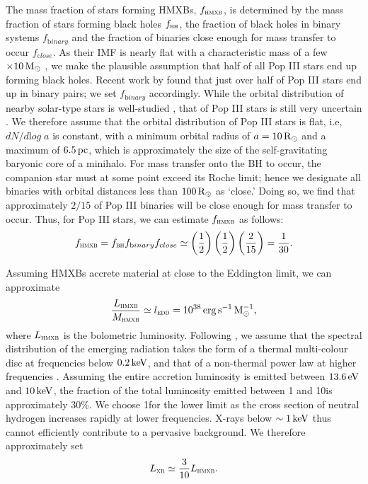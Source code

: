 \documentclass[../thesis.tex]{subfiles}
\begin{document}
The mass fraction of stars forming HMXBs, $f_{\textsc{hmxb}}$, is determined by
the mass fraction of stars forming black holes $f_{\textsc{bh}}$, the
fraction of black holes in binary systems $f_{\mathrm binary}$ and the
fraction of binaries close enough for mass transfer to occur
$f_{\mathrm close}$. As their IMF is nearly flat with a characteristic
mass of a few $\times10\,\mathrm{M}_{\odot}$ \citep{Bromm2013}, we make the
plausible assumption that half of all Pop III stars end up forming
black holes.  Recent work by \citet{StacyBromm2013} found that just
over half of Pop III stars end up in binary pairs; we set $f_{\mathrm
  binary}$ accordingly. While the orbital distribution of nearby
solar-type stars is well-studied \citep[e.g.,][]{DuquennoyMayor1991},
that of Pop III stars is still very uncertain \citep[but
see][]{StacyBromm2013}.  We therefore assume that the orbital
distribution of Pop III stars is flat, i.e, $dN/d{\mathrm log} \; a$ is
constant, with a minimum orbital radius of $a=10\,\mathrm{R}_{\odot}$ and a maximum of
$6.5\,\mathrm{pc}$, which is approximately the size of the self-gravitating baryonic core of a minihalo. For mass transfer onto the BH to occur, the companion star
must at some point exceed its Roche limit; hence we designate all
binaries with orbital distances less than $100\,\mathrm{R}_{\odot}$ as `close.'
Doing so, we find that approximately $2/15$ of Pop III binaries will be
close enough for mass transfer to occur.
 Thus, for Pop III stars, we can estimate $f_{\textsc{hmxb}}$ as follows:  
\begin{equation}
  f_{\textsc{hmxb}} = f_{\textsc{bh}} f_{\mathrm binary} f_{\mathrm close} \simeq \left(\frac{1}{2}\right) 
  \left(\frac{1}{2}\right) \left(\frac{2}{15}\right) = \frac{1}{30}.
\end{equation}

Assuming HMXBs accrete material at close to the Eddington limit, we can approximate 
\begin{equation}
  \frac{L_{\textsc{hmxb}}}{M_{\textsc{hmxb}}} \simeq l_\textsc{edd} = 10^{38} \,\mathrm{erg} \,\mathrm{s}^{-1} \,\mathrm{M}_{\odot}^{-1},
\end{equation}
where $L_{\textsc{hmxb}}$ is the bolometric luminosity.  Following \citet{Jeonetal2014a}, we assume that the spectral distribution of the
emerging radiation takes the form of a thermal multi-colour disc at
frequencies below $0.2 \,\mathrm{keV}$, and that of a non-thermal power law at
higher frequencies \citep[e.g.,][]{Mitsudaetal1984}.  Assuming the entire accretion luminosity is
emitted between $13.6\,\mathrm{eV}$ and $10\,\mathrm{keV}$, the fraction of the total
luminosity emitted between 1 and 10\kev is approximately 30\%.  We
choose 1\kev for the lower limit as the cross section of neutral
hydrogen increases rapidly at lower frequencies.   X-rays below
$\sim1\,\mathrm{keV}$ thus cannot efficiently contribute to a pervasive
background.  We therefore approximately set
\begin{equation}
L_{\textsc{xr}} \simeq \frac{3}{10} L_{\textsc{hmxb}}.
\end{equation}
\end{document}

